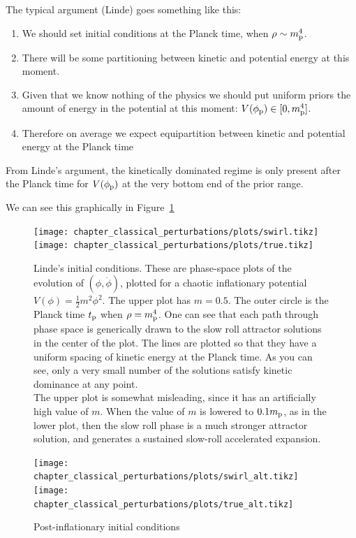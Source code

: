 The typical argument (Linde) goes something like this:

\begin{enumerate}
  \item We should set initial conditions at the Planck time, when
    $\rho\sim m_{\mathrm{p}}^4$.
  \item There will be some partitioning between kinetic and potential
    energy at this moment.
  \item Given that we know nothing of the physics we should put
    uniform priors the amount of energy in the potential at this
    moment: $V(\phi_{\mathrm{p}})\in[0,m_{\mathrm{p}}^4]$.
  \item Therefore on average we expect equipartition between kinetic
    and potential energy at the Planck time
\end{enumerate}

From Linde's argument, the kinetically dominated regime is only present
after the Planck time for $V(\phi_{\mathrm{p}})$ at the very bottom end of the
prior range.

We can see this graphically in Figure~\ref{fig:cls:linde}

\ifdefined\lightweight{}
\else
\begin{figure}
  \centering
  \texttt{[image: chapter\_classical\_perturbations/plots/swirl.tikz]}
  \texttt{[image: chapter\_classical\_perturbations/plots/true.tikz]}
  \caption{Linde's initial conditions. These are phase-space plots of the evolution of $(\phi,\dot{\phi})$, plotted for a chaotic inflationary potential $V(\phi) = \frac{1}{2}m^2 \phi^2$. The upper plot has $m=0.5$. The outer circle is the Planck time $t_{\mathrm{p}}$ when $\rho=m_{\mathrm{p}}^4$. One can see that each path through phase space is generically drawn to the slow roll attractor solutions in the center of the plot. The lines are plotted so that they have a uniform spacing of kinetic energy at the Planck time. As you can see, only a very small number of the solutions satisfy kinetic dominance at any point. \\
  The upper plot is somewhat misleading, since it has an artificially high value of $m$. When the value of $m$ is lowered to $0.1m_{\mathrm{p}}$, as in the lower plot, then the slow roll phase is a much stronger attractor solution, and generates a sustained slow-roll accelerated expansion.\label{fig:cls:linde}}
\end{figure}

\begin{figure}
  \centering
  \texttt{[image: chapter\_classical\_perturbations/plots/swirl\_alt.tikz]}
  \texttt{[image: chapter\_classical\_perturbations/plots/true\_alt.tikz]}
  \caption{Post-inflationary initial conditions}
\end{figure}
\fi





